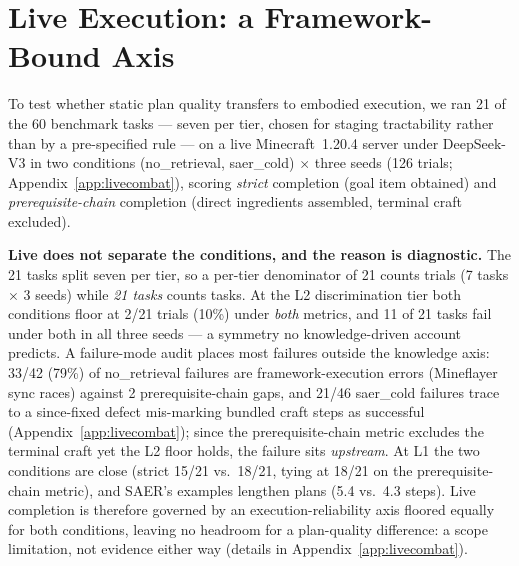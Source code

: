 \documentclass[letterpaper]{article} %
\newcommand{\appref}[1]{Appendix~\ref{#1}}
\begin{document}
\section{Live Execution: a Framework-Bound Axis}
\label{sec:live}

To test whether static plan quality transfers to embodied execution, we
ran 21 of the 60 benchmark tasks --- seven per tier, chosen for staging
tractability rather than by a pre-specified rule --- on a live
Minecraft~1.20.4 server under
DeepSeek-V3 in two conditions (no\_retrieval, saer\_cold) $\times$ three
seeds (126 trials; \appref{app:livecombat}), scoring \emph{strict}
completion (goal item obtained) and \emph{prerequisite-chain} completion
(direct ingredients assembled, terminal craft excluded).

\textbf{Live does not separate the conditions, and the reason is
diagnostic.}  The 21 tasks split seven per tier, so a per-tier denominator of
21 counts trials (7 tasks $\times$ 3 seeds) while \emph{21 tasks} counts
tasks.  At the L2 discrimination tier both conditions floor at
2/21 trials (10\%) under \emph{both} metrics, and 11 of 21 tasks fail under both
in all three seeds --- a symmetry no knowledge-driven account predicts.  A
failure-mode audit places most failures outside the knowledge axis:
33/42 (79\%) of no\_retrieval failures are framework-execution errors
(Mineflayer sync races) against 2 prerequisite-chain gaps, and 21/46
saer\_cold failures trace to a since-fixed defect mis-marking bundled craft
steps as successful (\appref{app:livecombat}); since the prerequisite-chain metric
excludes the terminal craft yet the L2 floor holds, the failure sits
\emph{upstream}.  At L1 the two conditions are close (strict 15/21
vs.\ 18/21, tying at 18/21 on the prerequisite-chain metric), and SAER's
examples lengthen plans (5.4 vs.\ 4.3 steps).  Live completion is therefore
governed by an execution-reliability axis floored equally for both
conditions, leaving no headroom for a plan-quality difference: a scope
limitation, not evidence either way (details in \appref{app:livecombat}).

\end{document}
